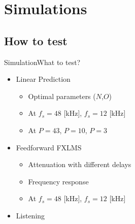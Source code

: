 


\section{Simulations}
\subsection{How to test}

\begin{frame}{Simulation}{What to test?}	
\begin{itemize}
	\item Linear Prediction
	\begin{itemize}
		\item Optimal parameters ($N$,$O$)
		\item At  $f_s = 48$ [kHz],  $f_s = 12$ [kHz]
		\item At $P=43$, $P=10$, $P=3$ 
	\end{itemize}
	\item Feedforward FXLMS	
	\begin{itemize}
		\item Attenuation with different delays
		\item Frequency response
		\item At  $f_s = 48$ [kHz],  $f_s = 12$ [kHz] 
	\end{itemize}
	\item Listening
\end{itemize}
\end{frame}

